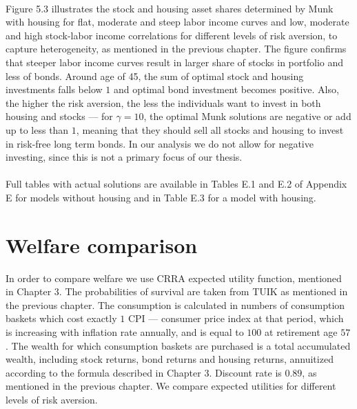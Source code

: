 \paragraph{}Figure 5.3 illustrates the stock and housing asset shares determined by Munk with housing for flat, moderate and steep labor income curves and low, moderate and high stock-labor income correlations for different levels of risk aversion, to capture heterogeneity, as mentioned in the previous chapter. The figure confirms that steeper labor income curves result in larger share of stocks in portfolio and less of bonds. Around age of 45, the sum of optimal stock and housing investments falls below $1$ and optimal bond investment becomes positive. Also, the higher the risk aversion, the less the individuals want to invest in both housing and stocks --- for $\gamma=10$, the optimal Munk solutions are negative or add up to less than $1$, meaning that they should sell all stocks and housing to invest in risk-free long term bonds. In our analysis we do not allow for negative investing, since this is not a primary focus of our thesis.  



\paragraph{}Full tables with actual solutions are available in Tables E.1 and E.2 of Appendix E for models without housing and in Table E.3 for a model with housing. 


\section{Welfare comparison}

In order to compare welfare we use CRRA expected utility function, mentioned in Chapter 3. The probabilities of survival are taken from TUIK as mentioned in the previous chapter. The consumption is calculated in numbers of consumption baskets which cost exactly $1$ CPI --- consumer price index at that period, which is increasing with inflation rate annually, and is equal to $100$ at retirement age $57$. The wealth for which consumption baskets are purchased is a total accumulated wealth, including stock returns, bond returns and housing returns, annuitized according to the formula described in Chapter 3. Discount rate is $0.89$, as mentioned in the previous chapter. We compare expected utilities for different levels of risk aversion.

